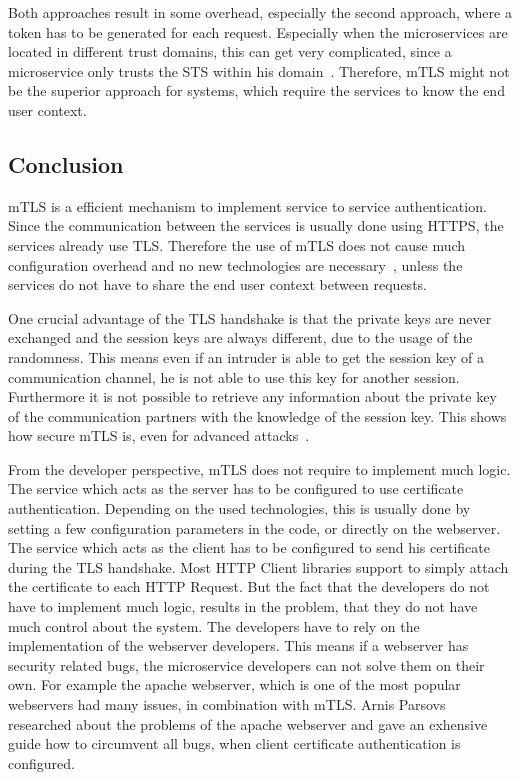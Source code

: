 Both approaches result in some overhead, especially the second approach, where a token has to be generated for each request.
Especially when the microservices are located in different trust domains, this can get very complicated, since a microservice only trusts the STS within his domain~\cite{dias2020microservices}.
Therefore, mTLS might not be the superior approach for systems, which require the services to know the end user context.

\subsection{Conclusion}
mTLS is a efficient mechanism to implement service to service authentication.
Since the communication between the services is usually done using HTTPS, the services already use TLS.
Therefore the use of mTLS does not cause much configuration overhead and no new technologies are necessary~\cite{dias2020microservices}, unless the services do not have to share the end user context between requests.

One crucial advantage of the TLS handshake is that the private keys are never exchanged and the session keys are always different, due to the usage of the randomness.
This means even if an intruder is able to get the session key of a communication channel, he is not able to use this key for another session.
Furthermore it is not possible to retrieve any information about the private key of the communication partners with the knowledge of the session key.
This shows how secure mTLS is, even for advanced attacks~\cite{parsovs2013practical}.

From the developer perspective, mTLS does not require to implement much logic.
The service which acts as the server has to be configured to use certificate authentication.
Depending on the used technologies, this is usually done by setting a few configuration parameters in the code, or directly on the webserver.
The service which acts as the client has to be configured to send his certificate during the TLS handshake.
Most HTTP Client libraries support to simply attach the certificate to each HTTP Request.
But the fact that the developers do not have to implement much logic, results in the problem, that they do not have much control about the system.
The developers have to rely on the implementation of the webserver developers.
This means if a webserver has security related bugs, the microservice developers can not solve them on their own.
For example the apache webserver, which is one of the most popular webservers had many issues, in combination with mTLS.
Arnis Parsovs~\cite{parsovs2013practical} researched about the problems of the apache webserver and gave an exhensive guide how to circumvent all bugs, when client certificate authentication is configured.

